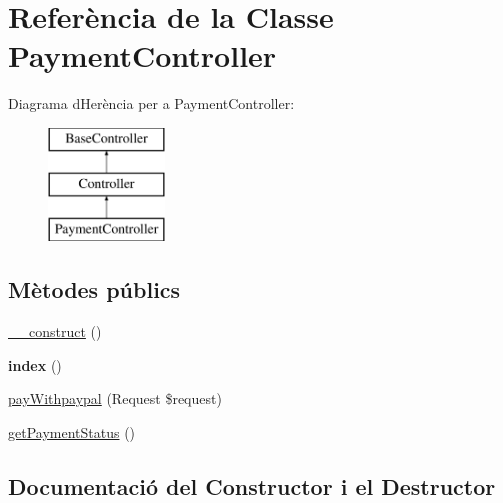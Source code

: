 \hypertarget{class_app_1_1_http_1_1_controllers_1_1_payment_controller}{}\section{Referència de la Classe Payment\+Controller}
\label{class_app_1_1_http_1_1_controllers_1_1_payment_controller}
Diagrama d\textquotesingle{}Herència per a Payment\+Controller\+:\begin{figure}[H]
\begin{center}
\leavevmode
\includegraphics[height=3.000000cm]{class_app_1_1_http_1_1_controllers_1_1_payment_controller}
\end{center}
\end{figure}
\subsection*{Mètodes públics}
\begin{DoxyCompactItemize}
\item 
\mbox{\hyperlink{class_app_1_1_http_1_1_controllers_1_1_payment_controller_a095c5d389db211932136b53f25f39685}{\+\_\+\+\_\+construct}} ()
\item 
\mbox{\label{class_app_1_1_http_1_1_controllers_1_1_payment_controller_a149eb92716c1084a935e04a8d95f7347}} 
{\bfseries index} ()
\item 
\mbox{\hyperlink{class_app_1_1_http_1_1_controllers_1_1_payment_controller_ac5fc82dc1ab26f22f5023f3a34cfe399}{pay\+Withpaypal}} (Request \$request)
\item 
\mbox{\hyperlink{class_app_1_1_http_1_1_controllers_1_1_payment_controller_a4fae285c47bd22cd04e7f1007f72148a}{get\+Payment\+Status}} ()
\end{DoxyCompactItemize}


\subsection{Documentació del Constructor i el Destructor}
\mbox{\label{class_app_1_1_http_1_1_controllers_1_1_payment_controller_a095c5d389db211932136b53f25f39685}} 
